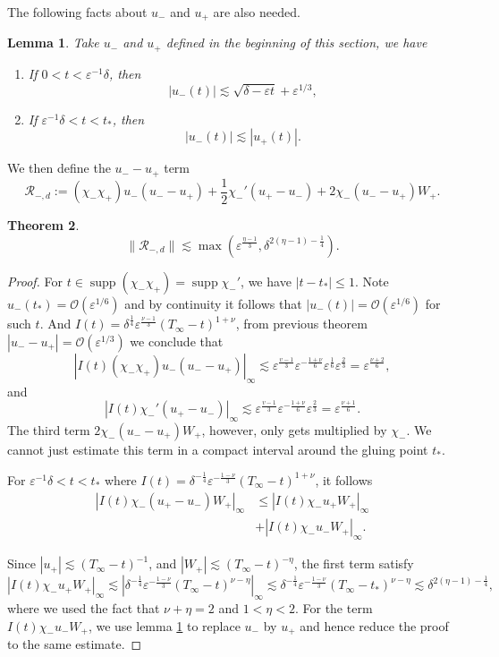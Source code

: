 \documentclass[letterpaper,11pt]{article}
\newcommand{\rmO}{\mathcal{O}}
\newcommand{\eps}{\varepsilon}
\newcommand{\lar}{ \lesssim }
\newcommand{\supp}{\operatorname{supp}}
\numberwithin{equation}{section}
\theoremstyle{plain}
\newtheorem{theorem}{Theorem}[section]
\newtheorem{lemma}[theorem]{Lemma}
\begin{document}
\begin{itemize}
\begin{enumerate}
The following facts about $u_-$ and $u_+$ are also needed.
\begin{lemma}\label{u_-est}
Take $u_-$ and $u_+$ defined in the beginning of this section, we have
\begin{enumerate}
\item If $0<t<\eps^{-1}\delta$, then
\[
 |u_-(t)| \lar \sqrt{\delta-\eps t}+\eps^{1/3},
 \]
 \item If $\eps^{-1}\delta < t <t_*$, then
 \[
 |u_-(t)|\lar |u_+(t)|.
 \]
\end{enumerate}
\end{lemma}

We then define the $u_--u_+$ term
\[
\mathcal{R}_{-,d} :=  (\chi_-\chi_+)u_-(u_--u_+) +\frac{1}{2}\chi_-'(u_+-u_-) + 2\chi_-(u_- -u_+)W_+ .
\]

\begin{theorem}
\[
\| \mathcal{R}_{-,d} \| \lar \max(\eps^{\frac{\eta-1}{3}}, \delta^{2(\eta-1)-\frac{1}{4}} ).
\]
\end{theorem}
\begin{proof}
For $t\in \supp (\chi_-\chi_+) = \supp \chi_-'$, we have $|t-t_*| \le 1$. Note $u_-(t_*) = \rmO(\eps^{1/6})$ and by continuity it follows that $|u_-(t)| = \rmO(\eps^{1/6})$ for such $t$. And $I(t)=\delta^{\frac{1}{4}}\eps^{\frac{\nu-1}{3}}(T_\infty-t)^{1+\nu}$, from previous theorem $|u_- - u_+| = \rmO(\eps^{1/3})$ we conclude that
\[
|I(t) (\chi_-\chi_+)u_-(u_--u_+)|_\infty \lar \eps^{\frac{v-1}{3}} \eps^{-\frac{1+\nu}{6}} \eps^{\frac{1}{6}}\eps^{\frac{2}{3}} = \eps^{\frac{\nu+2}{6}},
\]
 and
\[
|I(t) \chi_-'(u_+-u_-) |_\infty \lar\eps^{\frac{v-1}{3}} \eps^{-\frac{1+\nu}{6}} \eps^{\frac{2}{3}} = \eps^{\frac{\nu+1}{6}}.
\]
 The third term $2\chi_-(u_- -u_+)W_+$, however, only gets multiplied by $\chi_-$. We cannot just estimate this term in a compact interval around the gluing point $t_*$. 

For $\eps^{-1}\delta<t<t_*$ where $I(t) = \delta^{-\frac{1}{4}}\eps^{-\frac{1-\nu}{3}} (T_\infty - t)^{1+\nu}$, it follows
\begin{align*}
|I(t)  \chi_-(u_+ - u_-)W_+|_\infty &\le |I(t) \chi_-u_+ W_+|_\infty\\
&+|I(t) \chi_-u_- W_+|_\infty.
\end{align*}
 
Since $|u_+| \lar (T_\infty -t)^{-1}$, and $|W_+| \lar (T_\infty-t)^{-\eta}$, the first term satisfy
\[
|I(t)\chi_-u_+ W_+|_\infty \lar |\delta^{-\frac{1}{4}}\eps^{-\frac{1-\nu}{3}} (T_\infty-t)^{\nu - \eta} |_\infty \lar \delta^{-\frac{1}{4}}\eps^{-\frac{1-\nu}{3}} (T_\infty-t_*)^{\nu - \eta} \lar \delta^{2(\eta-1)-\frac{1}{4}},
\]
where we used the fact that $\nu+\eta =2 $ and $1<\eta<2$. For the term $I(t)\chi_-u_-W_+$, we use lemma \ref{u_-est} to replace $u_-$ by $u_+$ and hence reduce the proof to the same estimate.



\end{proof}
\end{enumerate}
\end{itemize}
\end{document}
